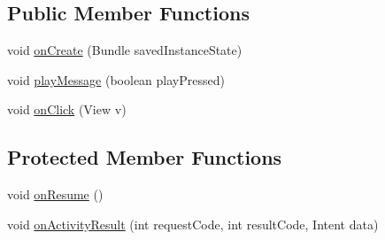 \subsection*{Public Member Functions}
\begin{DoxyCompactItemize}
\item 
void \hyperlink{classcsc440_1_1nuf_1_1_view_message_activity_a067f20ee5e75405a29b71d914d62a2fc}{on\-Create} (Bundle saved\-Instance\-State)
\item 
void \hyperlink{classcsc440_1_1nuf_1_1_view_message_activity_af7da4ac74c5aeb46448c50fa8479e13a}{play\-Message} (boolean play\-Pressed)
\item 
void \hyperlink{classcsc440_1_1nuf_1_1_view_message_activity_a8b4905772a4092ef3bc0e21ed23d7ae1}{on\-Click} (View v)
\end{DoxyCompactItemize}
\subsection*{Protected Member Functions}
\begin{DoxyCompactItemize}
\item 
void \hyperlink{classcsc440_1_1nuf_1_1_view_message_activity_ac15977b1ad20ed909ff3ce8ee4a85769}{on\-Resume} ()
\item 
void \hyperlink{classcsc440_1_1nuf_1_1_view_message_activity_a88e2195231d2097a71a9de8298532e23}{on\-Activity\-Result} (int request\-Code, int result\-Code, Intent data)
\end{DoxyCompactItemize}



